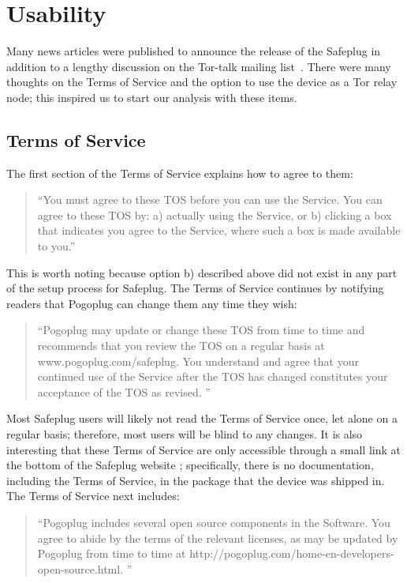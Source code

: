 \section{Usability}
\label{sec:usability}

Many news articles were published to announce the release of the Safeplug in addition to a lengthy discussion on the Tor-talk mailing list~\cite{tormailinglist}.  There were many thoughts on the Terms of Service and the option to use the device as a Tor relay node; this inspired us to start our analysis with these items.  

\subsection{Terms of Service}
\label{tos}
The first section of the Terms of Service explains how to agree to them:

\begin{quotation}
``You must agree to these TOS before you can use the Service. You can agree to these TOS by: a) actually using the Service, or b) clicking a box that indicates you agree to the Service, where such a box is made available to you.'' \cite{safeplug}
\end{quotation}

This is worth noting because option b) described above did not exist in any part of the setup process for Safeplug.  The Terms of Service continues by notifying readers that Pogoplug can change them any time they wish:

\begin{quotation}
``Pogoplug may update or change these TOS from time to time and recommends that you review the TOS on a regular basis at www.pogoplug.com/safeplug. You understand and agree that your continued use of the Service after the TOS has changed constitutes your acceptance of the TOS as revised. '' \cite{safeplug}
\end{quotation}

Most Safeplug users will likely not read the Terms of Service once, let alone on a regular basis; therefore, most users will be blind to any changes.  It is also interesting that these Terms of Service are only accessible through a small link at the bottom of the Safeplug website \cite{safeplug}; specifically, there is no documentation, including the Terms of Service, in the package that the device was shipped in.  The Terms of Service next includes:

\begin{quotation}
``Pogoplug includes several open source components in the Software. You agree to abide by the terms of the relevant licenses, as may be updated by Pogoplug from time to time at http://pogoplug.com/home-en-developers-open-source.html. '' \cite{safeplug}
\end{quotation}


